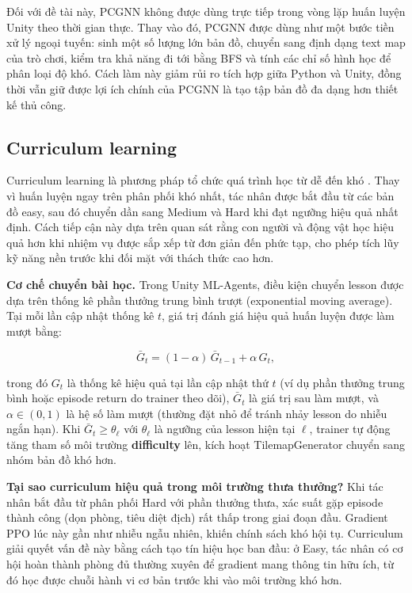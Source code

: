 Đối với đề tài này, PCGNN không được dùng trực tiếp trong vòng lặp huấn luyện Unity theo thời gian thực. Thay vào đó, PCGNN được dùng như một bước tiền xử lý ngoại tuyến: sinh một số lượng lớn bản đồ, chuyển sang định dạng text map của trò chơi, kiểm tra khả năng đi tới bằng BFS và tính các chỉ số hình học để phân loại độ khó. Cách làm này giảm rủi ro tích hợp giữa Python và Unity, đồng thời vẫn giữ được lợi ích chính của PCGNN là tạo tập bản đồ đa dạng hơn thiết kế thủ công.

\subsection{Curriculum learning}

Curriculum learning là phương pháp tổ chức quá trình học từ dễ đến khó \cite{Bengio2009}. Thay vì huấn luyện ngay trên phân phối khó nhất, tác nhân được bắt đầu từ các bản đồ easy, sau đó chuyển dần sang Medium và Hard khi đạt ngưỡng hiệu quả nhất định. Cách tiếp cận này dựa trên quan sát rằng con người và động vật học hiệu quả hơn khi nhiệm vụ được sắp xếp từ đơn giản đến phức tạp, cho phép tích lũy kỹ năng nền trước khi đối mặt với thách thức cao hơn.

\textbf{Cơ chế chuyển bài học.} Trong Unity ML-Agents, điều kiện chuyển lesson được dựa trên thống kê phần thưởng trung bình trượt (exponential moving average). Tại mỗi lần cập nhật thống kê $t$, giá trị đánh giá hiệu quả huấn luyện được làm mượt bằng:

\begin{equation}
    \bar{G}_t = (1 - \alpha)\,\bar{G}_{t-1} + \alpha\, G_t,
    \label{eq:curriculum_ema}
\end{equation}

trong đó $G_t$ là thống kê hiệu quả tại lần cập nhật thứ $t$ (ví dụ phần thưởng trung bình hoặc episode return do trainer theo dõi), $\bar{G}_t$ là giá trị sau làm mượt, và $\alpha \in (0,1)$ là hệ số làm mượt (thường đặt nhỏ để tránh nhảy lesson do nhiễu ngắn hạn). Khi $\bar{G}_t \geq \theta_\ell$ với $\theta_\ell$ là ngưỡng của lesson hiện tại $\ell$, trainer tự động tăng tham số môi trường \textbf{difficulty} lên, kích hoạt TilemapGenerator chuyển sang nhóm bản đồ khó hơn.

\textbf{Tại sao curriculum hiệu quả trong môi trường thưa thưởng?} Khi tác nhân bắt đầu từ phân phối Hard với phần thưởng thưa, xác suất gặp episode thành công (dọn phòng, tiêu diệt địch) rất thấp trong giai đoạn đầu. Gradient PPO lúc này gần như nhiễu ngẫu nhiên, khiến chính sách khó hội tụ. Curriculum giải quyết vấn đề này bằng cách tạo tín hiệu học ban đầu: ở Easy, tác nhân có cơ hội hoàn thành phòng đủ thường xuyên để gradient mang thông tin hữu ích, từ đó học được chuỗi hành vi cơ bản trước khi vào môi trường khó hơn.


